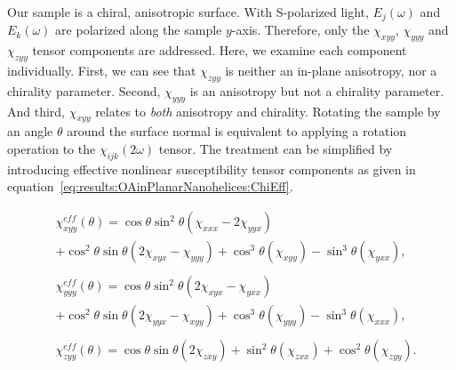 Our sample is a chiral, anisotropic surface. With S-polarized light, ${E_j}(\omega)$ and ${E_k}(\omega)$ are polarized along the sample $y$-axis. Therefore, only the $\chi_{xyy}$, $\chi_{yyy}$ and $\chi_{zyy}$ tensor components are addressed. Here, we examine each component individually. 
First, we can see that $\chi_{zyy}$ is neither an in-plane anisotropy, nor a chirality parameter. Second, $\chi_{yyy}$ is an anisotropy but not a chirality parameter. And third, $\chi_{xyy}$ relates to \textit{both} anisotropy and chirality. 
Rotating the sample by an angle $\theta$ around the surface normal is equivalent to applying a rotation operation to the $\chi_{ijk}(2\omega)$ tensor. The treatment can be simplified by introducing effective nonlinear susceptibility tensor components as given in equation~\ref{eq:results:OAinPlanarNanohelices:ChiEff}.

\begin{equation}\label{eq:results:OAinPlanarNanohelices:ChiEff}
	\begin{split}
		&\chi_{xyy}^{eff}(\theta) = \cos\theta\sin^2\theta(\chi_{xxx} - 2\chi_{yyx}) \\
		&+ {\cos^2}\theta\sin\theta (2\chi _{xyx} - \chi_{yyy}) + {\cos^3}\theta(\chi_{xyy}) - {\sin^3}\theta(\chi _{yxx}), \\
		\\
		&\chi_{yyy}^{eff}(\theta) = \cos\theta\sin^2\theta(2\chi_{xyx} - \chi_{yxx}) \\
		&+ {\cos^2}\theta\sin\theta (2\chi _{yyx} - \chi_{xyy}) + {\cos^3}\theta(\chi_{yyy}) - {\sin^3}\theta(\chi _{xxx}), \\
		\\
		&\chi _{zyy}^{eff}(\theta) = \cos\theta\sin\theta (2\chi_{zxy}) + {\sin^2}\theta(\chi_{zxx}) + {\cos^2}\theta (\chi_{zyy}).
	\end{split}
\end{equation}

